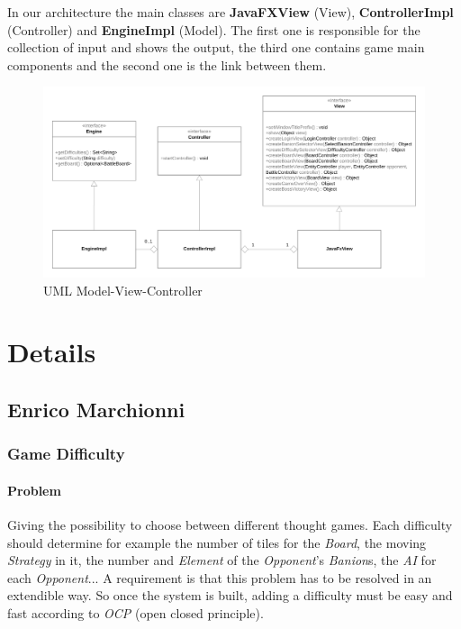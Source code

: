 \documentclass[12pt, a4paper]{report}
\begin{document}
    In our architecture the main classes are \textbf{JavaFXView} (View), \textbf{ControllerImpl} (Controller) and \textbf{EngineImpl} (Model). The
    first one is responsible for the collection of input and shows the output, the third one contains game main components and the second one is the link between them.

    \begin{figure}[ht]
    \centering{}
    \includegraphics[width=12cm]{mvc}
    \caption{UML Model-View-Controller}
    \end{figure}

\section{Details}

    \subsection*{Enrico Marchionni}

        \subsubsection{Game Difficulty}

            \paragraph{Problem}
            
            Giving the possibility to choose between different thought games.
            Each difficulty should determine for example the number of tiles for the \emph{Board}, the moving \emph{Strategy} in it,
            the number and \emph{Element} of the \emph{Opponent}'s \emph{Banion}s, the \emph{AI} for each \emph{Opponent}...
            A requirement is that this problem has to be resolved in an extendible way.
            So once the system is built, adding a difficulty must be easy and fast according to \emph{OCP} (open closed principle).
\end{document}
